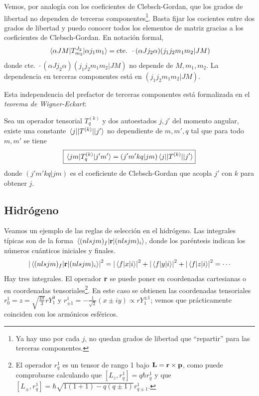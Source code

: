 Vemos, por analogía con los coeficientes de Clebsch-Gordan, que los
grados de libertad no dependen de terceras componentes\footnote{Ya hay
uno por cada $j$, no quedan grados de libertad que ``repartir'' para
las terceras componentes.}.
Basta fijar los cocientes entre dos grados de libertad y puedo conocer
todos los elementos de matriz gracias a los coeficientes de Clebsch-Gordan. En
notación formal,
\begin{equation}
  \mel{\alpha J M}{T_{m_2}^{J_2}}{\alpha j_1 m_1} = \text{cte. } \cdot (\alpha J j_2 \alpha)(j_1
  j_2 m_1 m_2 | JM)
\end{equation}
donde $\text{cte. }\cdot(\alpha J j_2 \alpha)(j_1
  j_2 m_1 m_2 | JM)$ no depende de 
$M,m_1,m_2$. La dependencia en terceras componentes está
en $(j_1
j_2 m_1 m_2 | JM)$. 

Esta independencia del prefactor de terceras componentes está
formalizada en el \emph{teorema de Wigner-Eckart}:
\begin{thm}
Sea un operador tensorial $T_q^{(k)}$ y dos autoestados $j,j'$ del
momento angular, existe una constante $\mel{j}{|T^{(k)}|}{j'}$ no
dependiente de $m,m',q$ tal que
para todo $m,m'$ se tiene
\begin{equation}
  \boxed{
  \mel{jm}{T_q^{(k)}}{j'm'} = (j'm'kq|jm) \mel{j}{|T^{(k)}|}{j'}
  }
\end{equation}
donde $(j'm'kq|jm)$ es el coeficiente de Clebsch-Gordan que acopla $j'$
con $k$ para obtener $j$.
\end{thm}


\subsection{Hidrógeno}
Veamos un ejemplo de las reglas de selección en el hidrógeno. Las
integrales típicas son de la forma 
$\mel{(nlsjm)_f}{\bm{\mathrm{r}}}{(nlsjm)_i}$, donde
los paréntesis indican los números cuánticos iniciales y finales.
\begin{equation}
\abs{ \mel{(nlsjm)_f}{\boldrm{r}}{(nlsjm)_i} }^2 =
\abs{\mel{f}{x}{i}}^2 + \abs{\mel{f}{y}{i}}^2 + \abs{\mel{f}{z}{i}}^2
= \cdots
\label{eq:puimerocks}
\end{equation}
Hay tres integrales. El operador $\bm{\mathrm{r}}$ se puede poner en
coordenadas cartesianas o en coordenadas tensoriales\footnote{El
  operador $r_q^1$ es un tensor de rango 1 bajo
  $\bm{\mathrm{L}}=\bm{\mathrm{r}}\times \bm{\mathrm{p}}$, como puede comprobarse
  calculando que $[L_z,r_q^1]=q \hbar r_q^1$ y que $[L_\pm,r_q^1]= \hbar
  \sqrt{1(1+1)-q(q\pm1)} r_{q\pm1}^1$.}. En este caso se obtienen las
coordenadas tensoriales $r_0^1=z = \sqrt{\frac{4\pi}{3}} r Y^0_1$ y $r_{\pm 1}^1= -
\frac{1}{\sqrt{2}}(x\pm iy) \propto r Y^{\pm 1}_1 $; vemos que
prácticamente coinciden con los armónicos esféricos.

